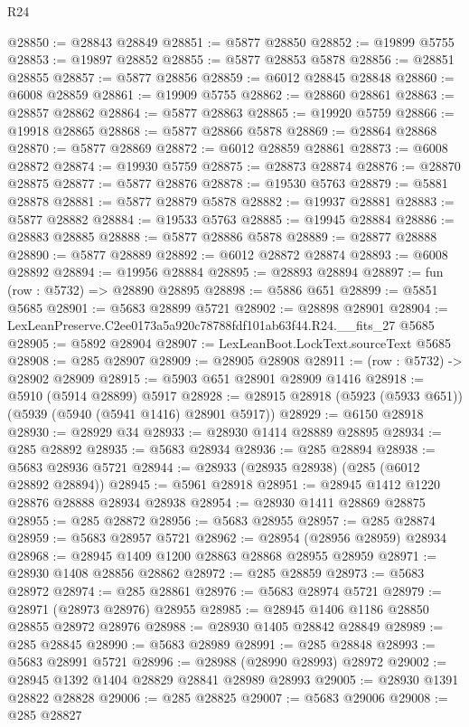 \begin{lexlean}{R24}
\begin{coremodule}
@28850 := @28843 @28849
@28851 := @5877 @28850
@28852 := @19899 @5755
@28853 := @19897 @28852
@28855 := @5877 @28853 @5878
@28856 := @28851 @28855
@28857 := @5877 @28856
@28859 := @6012 @28845 @28848
@28860 := @6008 @28859
@28861 := @19909 @5755
@28862 := @28860 @28861
@28863 := @28857 @28862
@28864 := @5877 @28863
@28865 := @19920 @5759
@28866 := @19918 @28865
@28868 := @5877 @28866 @5878
@28869 := @28864 @28868
@28870 := @5877 @28869
@28872 := @6012 @28859 @28861
@28873 := @6008 @28872
@28874 := @19930 @5759
@28875 := @28873 @28874
@28876 := @28870 @28875
@28877 := @5877 @28876
@28878 := @19530 @5763
@28879 := @5881 @28878
@28881 := @5877 @28879 @5878
@28882 := @19937 @28881
@28883 := @5877 @28882
@28884 := @19533 @5763
@28885 := @19945 @28884
@28886 := @28883 @28885
@28888 := @5877 @28886 @5878
@28889 := @28877 @28888
@28890 := @5877 @28889
@28892 := @6012 @28872 @28874
@28893 := @6008 @28892
@28894 := @19956 @28884
@28895 := @28893 @28894
@28897 := fun (row : @5732) => @28890 @28895
@28898 := @5886 @651
@28899 := @5851 @5685
@28901 := @5683 @28899 @5721
@28902 := @28898 @28901
@28904 := LexLeanPreserve.C2ee0173a5a920c78788fdf101ab63f44.R24.__fits_27 @5685
@28905 := @5892 @28904
@28907 := LexLeanBoot.LockText.sourceText @5685
@28908 := @285 @28907
@28909 := @28905 @28908
@28911 := (row : @5732) -> @28902 @28909
@28915 := @5903 @651 @28901 @28909 @1416
@28918 := @5910 (@5914 @28899) @5917
@28928 := @28915 @28918 (@5923 (@5933 @651)) (@5939 (@5940 (@5941 @1416) @28901 @5917))
@28929 := @6150 @28918
@28930 := @28929 @34
@28933 := @28930 @1414 @28889 @28895
@28934 := @285 @28892
@28935 := @5683 @28934
@28936 := @285 @28894
@28938 := @5683 @28936 @5721
@28944 := @28933 (@28935 @28938) (@285 (@6012 @28892 @28894))
@28945 := @5961 @28918
@28951 := @28945 @1412 @1220 @28876 @28888 @28934 @28938
@28954 := @28930 @1411 @28869 @28875
@28955 := @285 @28872
@28956 := @5683 @28955
@28957 := @285 @28874
@28959 := @5683 @28957 @5721
@28962 := @28954 (@28956 @28959) @28934
@28968 := @28945 @1409 @1200 @28863 @28868 @28955 @28959
@28971 := @28930 @1408 @28856 @28862
@28972 := @285 @28859
@28973 := @5683 @28972
@28974 := @285 @28861
@28976 := @5683 @28974 @5721
@28979 := @28971 (@28973 @28976) @28955
@28985 := @28945 @1406 @1186 @28850 @28855 @28972 @28976
@28988 := @28930 @1405 @28842 @28849
@28989 := @285 @28845
@28990 := @5683 @28989
@28991 := @285 @28848
@28993 := @5683 @28991 @5721
@28996 := @28988 (@28990 @28993) @28972
@29002 := @28945 @1392 @1404 @28829 @28841 @28989 @28993
@29005 := @28930 @1391 @28822 @28828
@29006 := @285 @28825
@29007 := @5683 @29006
@29008 := @285 @28827

\end{coremodule}
\end{lexlean}
